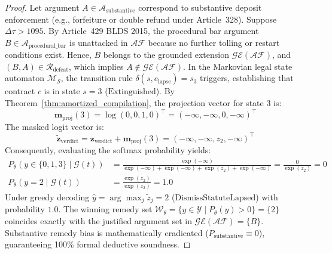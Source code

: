 \documentclass[11pt,a4paper]{article}
\begin{document}
\begin{proof}
Let argument $A \in \mathcal{A}_{\text{substantive}}$ correspond to substantive deposit enforcement (e.g., forfeiture or double refund under Article~328). Suppose $\Delta \tau > 1095$. By Article~429 BLDS 2015, the procedural bar argument $B \in \mathcal{A}_{\text{procedural\_bar}}$ is unattacked in $\mathcal{AF}$ because no further tolling or restart conditions exist. Hence, $B$ belongs to the grounded extension $\mathcal{GE}(\mathcal{AF})$, and $(B, A) \in \mathcal{R}_{\text{defeat}}$, which implies $A \notin \mathcal{GE}(\mathcal{AF})$.
In the Markovian legal state automaton $\mathcal{M}_{\mathcal{S}}$, the transition rule $\delta(s, e_{\text{lapse}}) = s_3$ triggers, establishing that contract $c$ is in state $s = 3$ ($\text{Extinguished}$).
By Theorem~\ref{thm:amortized_compilation}, the projection vector for state $3$ is:
\begin{equation}
\mathbf{m}_{\text{proj}}(3) = \log(0, 0, 1, 0)^\top = (-\infty, -\infty, 0, -\infty)^\top
\end{equation}
The masked logit vector is:
\begin{equation}
\tilde{\mathbf{z}}_{\text{verdict}} = \mathbf{z}_{\text{verdict}} + \mathbf{m}_{\text{proj}}(3) = (-\infty, -\infty, z_2, -\infty)^\top
\end{equation}
Consequently, evaluating the softmax probability yields:
\begin{align}
P_\theta(y \in \{0, 1, 3\} \mid \mathcal{G}(t)) &= \frac{\exp(-\infty)}{\exp(-\infty) + \exp(-\infty) + \exp(z_2) + \exp(-\infty)} = \frac{0}{\exp(z_2)} = 0 \\
P_\theta(y = 2 \mid \mathcal{G}(t)) &= \frac{\exp(z_2)}{\exp(z_2)} = 1.0
\end{align}
Under greedy decoding $\hat{y} = \arg\max_{j} \tilde{z}_j = 2$ ($\text{DismissStatuteLapsed}$) with probability $1.0$.
The winning remedy set $\mathcal{W}_\theta = \{ y \in \mathcal{Y} \mid P_\theta(y) > 0 \} = \{2\}$ coincides exactly with the justified argument set in $\mathcal{GE}(\mathcal{AF}) = \{B\}$.
Substantive remedy bias is mathematically eradicated ($P_{\text{substantive}} \equiv 0$), guaranteeing 100\% formal deductive soundness.
\end{proof}
\end{document}
